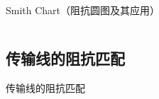 \begin{frame}{Smith Chart（阻抗圆图及其应用）}
\begin{columns}
\begin{column}{0.5\linewidth}
  \end{column}
 \end{columns}
\end{frame}

\subsection{传输线的阻抗匹配}
\begin{frame}{传输线的阻抗匹配}

\end{frame}
